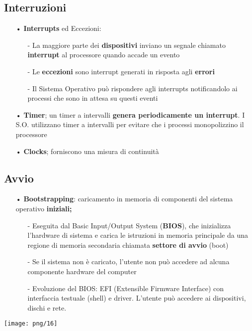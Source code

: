 \documentclass[12pt, letterpaper]{article}
\begin{document}
\subsection{Interruzioni}

\begin{itemize}
   \item[•] \textbf{Interrupts} ed Eccezioni:
      \begin{itemize}
         \item[-] La maggiore parte dei \textbf{dispositivi} inviano un segnale chiamato \textbf{interrupt} al processore quando accade un evento
         \item[-] Le \textbf{eccezioni} sono interrupt generati in risposta agli \textbf{errori}
         \item[-] Il Sistema Operativo può rispondere agli interrupts notificandolo ai processi che sono in attesa su questi eventi
      \end{itemize}
   \item[•] \textbf{Timer}; un timer a intervalli \textbf{genera periodicamente un interrupt}. I S.O. utilizzano timer a intervalli per evitare che i processi 
      monopolizzino il processore 
   \item[•] \textbf{Clocks}; forniscono una misura di continuità
\end{itemize}

\subsection{Avvio}

\begin{itemize}
   \item[•] \textbf{Bootstrapping}: caricamento in memoria di componenti del sistema operativo \textbf{iniziali;}
      \begin{itemize}
         \item[-] Eseguita dal Basic Input/Output System (\textbf{BIOS}), che inizializza l'hardware di sistema e carica le istruzioni in memoria principale da una regione di memoria secondaria chiamata \textbf{settore di avvio} (boot)
         \item[-] Se il sistema non è caricato, l'utente non può accedere ad alcuna componente hardware del computer 
         \item[-] Evoluzione del BIOS: EFI (Extensible Firmware Interface) con interfaccia testuale (shell) e driver. L'utente può 
            accedere ai dispositivi, dischi e rete.
      \end{itemize}
\end{itemize}
\texttt{[image: png/16]}
\end{document}
